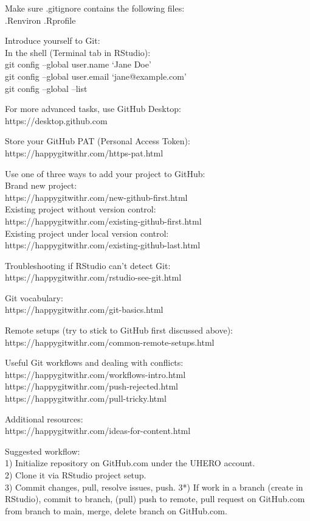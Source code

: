 \documentclass[
  letterpaper,
  DIV=11,
  numbers=noendperiod]{scrreport}
\begin{document}
Make sure .gitignore contains the following files:\\
.Renviron .Rprofile

Introduce yourself to Git:\\
In the shell (Terminal tab in RStudio):\\
git config --global user.name `Jane Doe'\\
git config --global user.email `jane@example.com'\\
git config --global --list

For more advanced tasks, use GitHub Desktop:\\
https://desktop.github.com

Store your GitHub PAT (Personal Access Token):\\
https://happygitwithr.com/https-pat.html

Use one of three ways to add your project to GitHub:\\
Brand new project:\\
https://happygitwithr.com/new-github-first.html\\
Existing project without version control:\\
https://happygitwithr.com/existing-github-first.html\\
Existing project under local version control:\\
https://happygitwithr.com/existing-github-last.html

Troubleshooting if RStudio can't detect Git:\\
https://happygitwithr.com/rstudio-see-git.html

Git vocabulary:\\
https://happygitwithr.com/git-basics.html

Remote setups (try to stick to GitHub first discussed above):\\
https://happygitwithr.com/common-remote-setups.html

Useful Git workflows and dealing with conflicts:\\
https://happygitwithr.com/workflows-intro.html\\
https://happygitwithr.com/push-rejected.html\\
https://happygitwithr.com/pull-tricky.html

Additional resources:\\
https://happygitwithr.com/ideas-for-content.html

Suggested workflow:\\
1) Initialize repository on GitHub.com under the UHERO account.\\
2) Clone it via RStudio project setup.\\
3) Commit changes, pull, resolve issues, push. 3*) If work in a branch
(create in RStudio), commit to branch, (pull) push to remote, pull
request on GitHub.com from branch to main, merge, delete branch on
GitHub.com.
\end{document}
